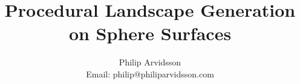 \author{Philip Arvidsson \\ {Email: philip@philiparvidsson.com}}
\title{\Huge{Procedural Landscape Generation on Sphere Surfaces}}

\maketitle
